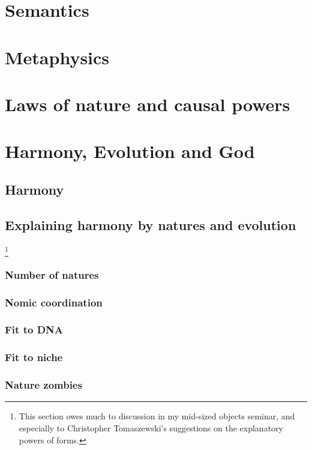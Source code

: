 \chapter{Semantics}\label{ch:semantics}
\chaptertail

\def\mychapter{VI}

\chapter{Metaphysics}\label{ch:metaphysics}
\chaptertail 

\def\mychapter{VII}

\chapter{Laws of nature and causal powers}\label{ch:laws}
\chaptertail

\def\mychapter{VIII}

\chapter{Harmony, Evolution and God}\label{ch:God}
\section{Harmony}
\section{Explaining harmony by natures and evolution}
\footnote{This section owes much to discussion in my mid-sized objects seminar, and especially to Christopher Tomaszewski's suggestions on the explanatory powers of forms.}
\subsection{Number of natures}
\subsection{Nomic coordination}
\subsection{Fit to DNA}
\subsection{Fit to niche}
\subsection{Nature zombies}
